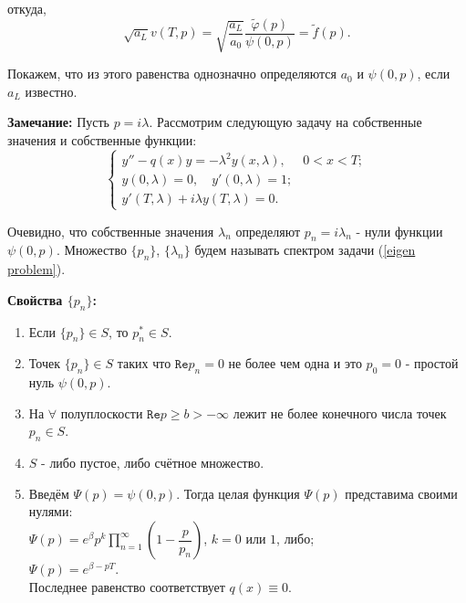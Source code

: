 \documentclass{article}
\begin{document}
откуда,
\begin{equation}
\sqrt{a_L} v(T,p) = \sqrt{\dfrac{a_L}{a_0}} \dfrac{\tilde{\varphi}(p)}{\psi(0,p)} = \tilde{f}(p).
\end{equation}

Покажем, что из этого равенства однозначно определяются $a_0$ и $\psi(0,p)$, если $a_L$ известно.

\textbf{Замечание:} Пусть $p = i \lambda$. 
Рассмотрим следующую задачу на собственные значения и собственные функции:
\begin{equation}
\begin{cases}
	y'' - q(x) y = -\lambda^2 y(x,\lambda), & 0<x<T;\\
	y(0,\lambda) = 0, \quad  y'(0,\lambda) = 1;\\
	y'(T,\lambda) + i \lambda y(T,\lambda) = 0.
\end{cases}
\label{eigen problem}
\end{equation}

Очевидно, что собственные значения $\lambda_n$ определяют $p_n = i\lambda_n$ - нули функции $\psi(0,p)$.
Множество $\{p_n\}$, $\{\lambda_n\}$ будем называть спектром задачи (\ref{eigen problem}).

\textbf{Свойства $\{p_n\}$:}
\begin{enumerate}
	\item Если $\{p_n\} \in S$, то $p_n^* \in S$.
	\item Точек $\{p_n\} \in S$ таких что $ \texttt{Re} p_n = 0$ не более чем одна и это $p_0 = 0$ - простой нуль $\psi(0,p)$.
	\item На $\forall$ полуплоскости $ \texttt{Re} p \geqslant b > -\infty$ лежит не более конечного числа точек $p_n \in S$.
	\item $S$ - либо пустое, либо счётное множество.
	\item Введём $\Psi(p) = \psi(0,p)$. Тогда целая функция $\Psi(p)$ представима своими нулями: \\
	$\Psi(p) = e^{\beta} p^k \prod_{n = 1}^{\infty} ( 1 - \dfrac{p}{p_n})$, $ k = 0$ или $1$, либо;\\
	$\Psi(p) = e^{\beta - pT}$.\\
	Последнее равенство соответствует $q(x) \equiv 0$.
\end{enumerate}
\end{document}
